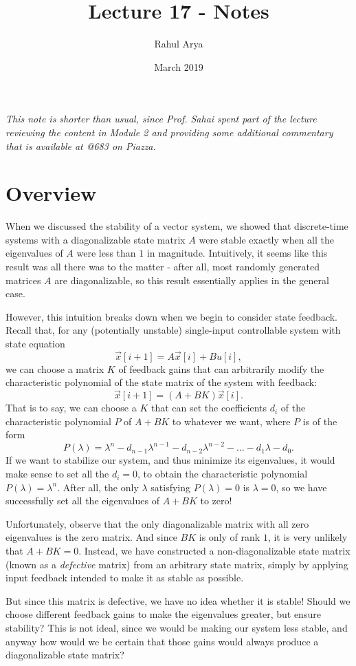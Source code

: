 \documentclass[letterpaper]{article}
\title{Lecture 17 - Notes}
\author{Rahul Arya}
\date{March 2019}
\theoremstyle{remark}
\begin{document}
\maketitle

\emph{This note is shorter than usual, since Prof. Sahai spent part of the lecture reviewing the content in Module 2 and providing some additional commentary that is available at @683 on Piazza.}

\section{Overview}
When we discussed the stability of a vector system, we showed that discrete-time systems with a diagonalizable state matrix $A$ were stable exactly when all the eigenvalues of $A$ were less than $1$ in magnitude. Intuitively, it seems like this result was all there was to the matter - after all, most randomly generated matrices $A$ are diagonalizable, so this result essentially applies in the general case.

However, this intuition breaks down when we begin to consider state feedback. Recall that, for any (potentially unstable) single-input controllable system with state equation
\[
    \vec{x}[i + 1] = A\vec{x}[i] + Bu[i],
\]
we can choose a matrix $K$ of feedback gains that can arbitrarily modify the characteristic polynomial of the state matrix of the system with feedback:
\[
    \vec{x}[i + 1] = (A + BK)\vec{x}[i].
\]
That is to say, we can choose a $K$ that can set the coefficients $d_i$ of the characteristic polynomial $P$ of $A + BK$ to whatever we want, where $P$ is of the form
\[
    P(\lambda) = \lambda^n - d_{n-1}\lambda^{n-1} - d_{n-2}\lambda^{n-2} - \ldots - d_1\lambda - d_0.
\]
If we want to stabilize our system, and thus minimize its eigenvalues, it would make sense to set all the $d_i = 0$, to obtain the characteristic polynomial $P(\lambda) = \lambda^n$. After all, the only $\lambda$ satisfying $P(\lambda) = 0$ is $\lambda = 0$, so we have successfully set all the eigenvalues of $A + BK$ to zero!

Unfortunately, observe that the only diagonalizable matrix with all zero eigenvalues is the zero matrix. And since $BK$ is only of rank $1$, it is very unlikely that $A + BK = 0$. Instead,  we have constructed a non-diagonalizable state matrix (known as a \emph{defective} matrix) from an arbitrary state matrix, simply by applying input feedback intended to make it as stable as possible.

But since this matrix is defective, we have no idea whether it is stable! Should we choose different feedback gains to make the eigenvalues greater, but ensure stability? This is not ideal, since we would be making our system less stable, and anyway how would we be certain that those gains would always produce a diagonalizable state matrix?
\end{document}
